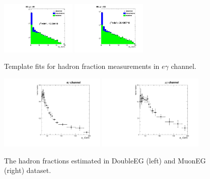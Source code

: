\documentclass[thesis.tex]{subfiles}
\renewcommand\_{\textunderscore\allowbreak}
\begin{document}
\begin{figure}[hbtp]
   \includegraphics[width=0.32\textwidth]{Figures/frac-80-90_ChIso-DoubleEG-ReMiniAOD.pdf}   \includegraphics[width=0.32\textwidth]{Figures/frac-90-120_ChIso-DoubleEG-ReMiniAOD.pdf}   \\
  \caption{Template fits for hadron fraction measurements in $e\gamma$ channel.}
 \label{fig:DoubleEGjetfakebins}
\end{figure}

\begin{figure}[hbtp]
  \centering
    \includegraphics[width=0.45\textwidth]{Figures/JetFakePho_DoubleEG_ReMiniAOD.pdf}
    \includegraphics[width=0.45\textwidth]{Figures/JetFakePho_MuonEG_ReMiniAOD.pdf}
  \caption{The hadron fractions estimated in DoubleEG (left) and MuonEG (right) dataset.} 
    \label{fig:hadronfraction}
\end{figure}
\end{document}
